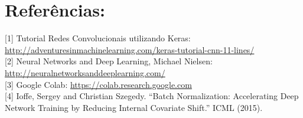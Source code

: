 
    \section{Referências:}\label{referencias}

[1] Tutorial Redes Convolucionais utilizando
Keras:
\href{http://adventuresinmachinelearning.com/keras-tutorial-cnn-11-lines/}{
http://adventuresinmachinelearning.com/keras-tutorial-cnn-11-lines/}\\

[2] Neural Networks and Deep Learning, Michael Nielsen:
\href{http://neuralnetworksanddeeplearning.com/}{http://neuralnetworksanddeeplearning.com/}\\

[3] Google Colab:
\href{https://colab.research.google.com}{https://colab.research.google.com}\\

[4] Ioffe, Sergey and Christian Szegedy. “Batch Normalization: Accelerating Deep Network Training by Reducing Internal Covariate Shift.” ICML (2015).

    
